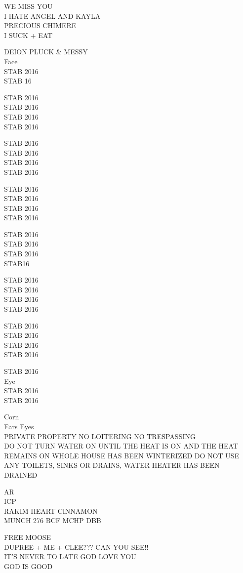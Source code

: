 \documentclass[10pt,letterpaper]{article}
\begin{document}
WE MISS YOU\\
I HATE ANGEL AND KAYLA\\
PRECIOUS CHIMERE\\
I SUCK + EAT

DEION PLUCK \& MESSY\\
Face\\
STAB 2016\\
STAB 16

STAB 2016\\
STAB 2016\\
STAB 2016\\
STAB 2016

STAB 2016\\
STAB 2016\\
STAB 2016\\
STAB 2016

STAB 2016\\
STAB 2016\\
STAB 2016\\
STAB 2016

STAB 2016\\
STAB 2016\\
STAB 2016\\
STAB16

STAB 2016\\
STAB 2016\\
STAB 2016\\
STAB 2016

STAB 2016\\
STAB 2016\\
STAB 2016\\
STAB 2016

STAB 2016\\
Eye\\
STAB 2016\\
STAB 2016

Corn\\
Ears Eyes\\
PRIVATE PROPERTY NO LOITERING NO TRESPASSING\\
DO NOT TURN WATER ON UNTIL THE HEAT IS ON AND THE HEAT REMAINS ON WHOLE HOUSE HAS BEEN WINTERIZED DO NOT USE ANY TOILETS, SINKS OR DRAINS, WATER HEATER HAS BEEN DRAINED

AR\\
ICP\\
RAKIM HEART CINNAMON\\
MUNCH 276 BCF MCHP DBB

FREE MOOSE\\
DUPREE + ME + CLEE??? CAN YOU SEE!!\\
IT'S NEVER TO LATE GOD LOVE YOU\\
GOD IS GOOD
\end{document}
